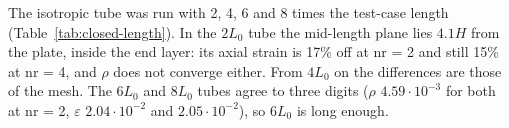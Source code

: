 The isotropic tube was run with 2, 4, 6 and 8 times the
test-case length (Table~\ref{tab:closed-length}). In the $2L_0$ tube the mid-length plane
lies $4.1H$ from the plate, inside the end layer: its axial strain is 17\% off at nr = 2
and still 15\% at nr = 4, and $\rho$ does not converge either. From $4L_0$ on the
differences are those of the mesh. The $6L_0$ and $8L_0$ tubes agree to three digits
($\rho$ $4.59\cdot10^{-3}$ for both at nr = 2, $\varepsilon$ $2.04\cdot10^{-2}$ and
$2.05\cdot10^{-2}$), so $6L_0$ is long enough.

